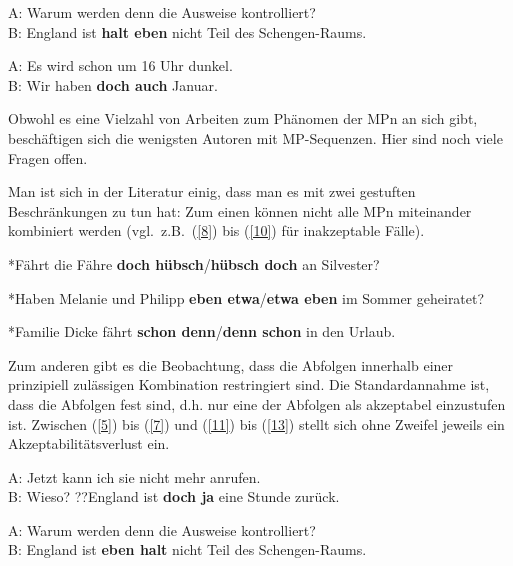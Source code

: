 \begin{exe}
	\ex\label{6} 
		A: Warum werden denn die Ausweise kontrolliert? \\
		B: England ist \textbf{halt eben} nicht Teil des Schengen-Raums.
\end{exe}

\begin{exe}
	\ex\label{7} 
		A: Es wird schon um 16 Uhr dunkel. \\
		B: Wir haben \textbf{doch auch} Januar.
\end{exe}	
Obwohl es eine Vielzahl von Arbeiten zum Phänomen der MPn an sich gibt, beschäftigen sich die wenigsten Autoren mit MP-Sequenzen. Hier sind noch viele Fragen offen.

Man ist sich in der Literatur einig, dass man es mit zwei gestuften Beschränkungen zu tun hat: Zum einen können nicht alle MPn miteinander kombiniert werden (vgl.\ z.B.\ (\ref{8}) bis (\ref{10}) für inakzeptable Fälle).

\begin{exe}
	\ex\label{8} 
		*Fährt die Fähre \textbf{doch hübsch}/\textbf{hübsch doch} an Silvester?
\end{exe}

\begin{exe}
	\ex\label{9} 
		*Haben Melanie und Philipp \textbf{eben etwa}/\textbf{etwa eben} im Sommer geheiratet?
\end{exe}
\begin{exe}
	\ex\label{10} 
		*Familie Dicke fährt \textbf{schon denn}/\textbf{denn schon} in den Urlaub.
	\newline
	\hbox{}\hfill\hbox{\citet[84]{Mueller2014b}}
\end{exe}	
Zum anderen gibt es die Beobachtung, dass die Abfolgen innerhalb einer prinzi\-piell zulässigen Kombination restringiert sind. Die Standardannahme ist, dass die Abfolgen fest sind, d.h. nur eine der Abfolgen als akzeptabel einzustufen ist. Zwischen (\ref{5}) bis (\ref{7}) und (\ref{11}) bis (\ref{13}) stellt sich ohne Zweifel jeweils ein Akzep\-tabilitätsverlust ein.

\begin{exe}
	\ex\label{11} 
		A: Jetzt kann ich sie nicht mehr anrufen. \\
		B: Wieso? ??England ist \textbf{doch ja} eine Stunde zurück.
\end{exe}

\begin{exe}
	\ex\label{12} 
		A: Warum werden denn die Ausweise kontrolliert? \\
		B: England ist \textbf{eben halt} nicht Teil des Schengen-Raums.
\end{exe}

